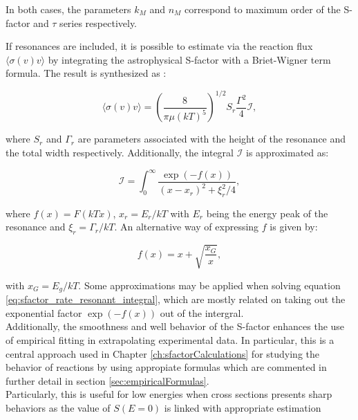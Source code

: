 \documentclass[openany]{book}
\begin{document}
In both cases, the parameters $k_M$ and $n_M$ correspond to maximum order of the S-factor and $\tau$ series respectively.


If resonances are included, it is possible to estimate via the reaction flux $\langle \sigma (v) v \rangle$ by integrating the astrophysical S-factor with a Briet-Wigner term formula. The result is synthesized as \cite{ueda_sargeant_pato_hussein_2004}: 

 \begin{equation}\label{eq:sfactor_rate_resonant}
 	\langle \sigma (v) v \rangle= \left ( \frac{8}{\pi \mu (kT)^5} \right)^{1/2} S_r \frac{\Gamma^2}{4} \mathcal{I},
 \end{equation}

where $S_r$ and $\Gamma_r$ are parameters associated with the height of the resonance and the total width respectively. Additionally, the integral $\mathcal{I}$ is approximated as: 

 \begin{equation}\label{eq:sfactor_rate_resonant_integral}
	 \mathcal{I} = \int_{0}^{\infty} {\frac{\exp{(-f(x))}}{(x-x_r)^2 + \xi^2_r/4}}, 
\end{equation}

where $f(x) = F(kTx)$, $x_r = E_r/kT$ with $E_r$ being the energy peak of the resonance and $\xi_r = \Gamma_r/kT$. An alternative way of expressing $f$ is given by:

\begin{equation}\label{eq:sfactor_rate_resonant_f}
	f(x) = x + \sqrt{\frac{x_G}{x}}, 
\end{equation}

with $x_G = E_g/kT$. Some approximations may be applied when solving equation \ref{eq:sfactor_rate_resonant_integral}, which are mostly related on taking out the exponential factor  $\exp{(-f(x))}$ out of the intergral. \\



Additionally, the smoothness and well behavior of the S-factor enhances the use of empirical fitting in extrapolating experimental data. In particular, this is a central approach used in Chapter \ref{ch:sfactorCalculations} for studying the behavior of reactions by using appropiate formulas which are commented in further detail in section \ref{sec:empiricalFormulas}.  \\

Particularly, this is useful for low energies when cross sections presents sharp behaviors as the value of $S(E = 0)$ is linked with appropriate estimation  \\
\end{document}
